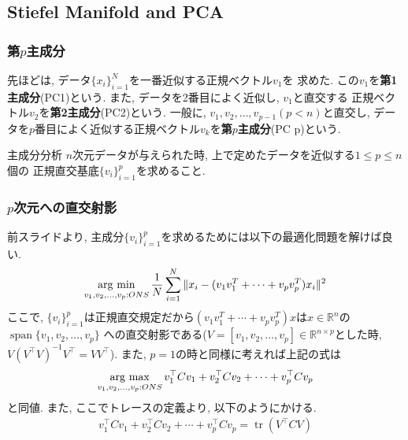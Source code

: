 \documentclass[dvipdfmx,11pt]{beamer}		%
\newcommand{\R}{\mathbb{R}}
\newcommand{\argmax}{\mathop{\rm arg~max}\limits}
\newcommand{\argmin}{\mathop{\rm arg~min}\limits}
\begin{document}
    \subsection{Stiefel Manifold and PCA}
    \begin{frame}
        \frametitle{第$p$主成分}
        先ほどは, データ$\{x_i\}_{i = 1}^N$を一番近似する正規ベクトル$v_1$を
        求めた. この$v_1$を\textbf{第1主成分}(PC1)という. また, データを2番目によく近似し, $v_1$と直交する
        正規ベクトル$v_2$を\textbf{第2主成分}(PC2)という. 一般に, $v_1, v_2, \ldots, v_{p-1} (p < n)$と直交し,
        データを$p$番目によく近似する正規ベクトル$v_k$を\textbf{第$p$主成分}(PC p)という. 
        \begin{block}{主成分分析} 
            $n$次元データが与えられた時, 上で定めたデータを近似する$1\leq p\leq n$個の
            正規直交基底$\{v_i\}_{i = 1}^p$を求めること.           
        \end{block}
    \end{frame}
    \begin{frame}
        \frametitle{$p$次元への直交射影}
        前スライドより, 主成分$\{v_i\}_{i = 1}^p$を求めるためには以下の最適化問題を解けば良い.
        \begin{align*}
            \argmin_{v_{1}, v_{2}, \ldots, v_{p} : ONS} \frac{1}{N} \sum_{i=1}^{N}\|x_{i}-(v_{1} v_{1}^{T}+\cdots+v_{p} v_{p}^{T}) x_{i}\|^{2}
        \end{align*}
        ここで, $\{v_i\}_{i = 1}^p$は正規直交規定だから$(v_{1} v_{1}^{T}+\cdots+v_{p} v_{p}^{T}) x$は$x\in\R^n$の$\operatorname{span}\{v_1, v_2,\ldots, v_p\}$
        への直交射影である($V = [v_1, v_2, \ldots, v_p]\in\R^{n\times p}$とした時, $V(V^{\top}V)^{-1}V^{\top} = VV^{\top}$). また, $p = 1$の時と同様に考えれば上記の式は
        \begin{align*}
            \argmax_{v_{1}, v_{2}, \ldots, v_{p} : ONS} v_1^{\top}Cv_1 + v_2^{\top}Cv_2 + \cdots + v_p^{\top}Cv_p
        \end{align*}
        と同値. また, ここでトレースの定義より, 以下のようにかける. 
        \begin{align*}
            v_1^{\top}Cv_1 + v_2^{\top}Cv_2 + \cdots + v_p^{\top}Cv_p = \operatorname{tr}(V^{\top}CV)
        \end{align*}  
    \end{frame}
\end{document}
